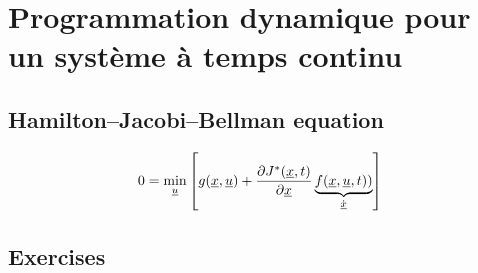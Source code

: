 \section{Programmation dynamique pour un système à temps continu}
\label{sec:dp_continu}

\subsection{Hamilton–Jacobi–Bellman equation}

\begin{align}
0 =
\operatornamewithlimits{min}\limits_{\col{u}}
\left[
g(\col{x} , \col{u} ) + \frac{\partial	J^*(\col{x},t)}{\partial \col{x} }
\underbrace{
f(\col{x} , \col{u} , t) )
}_{\dot{\col{x}}}
\right]
\label{eq:hjb}
\end{align} 


\subsection{Exercises}